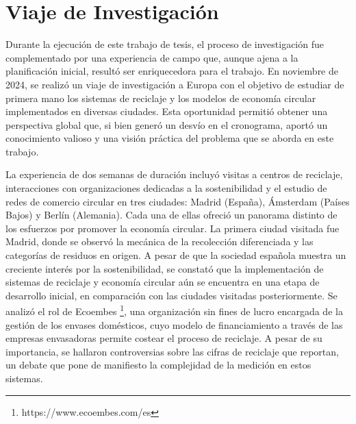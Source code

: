 \chapter{Viaje de Investigación}
\label{cp:europe-trip}

Durante la ejecución de este trabajo de tesis, el proceso de investigación fue complementado por una experiencia de campo que, aunque ajena a la planificación inicial, resultó ser enriquecedora para el trabajo. En noviembre de 2024, se realizó un viaje de investigación a Europa con el objetivo de estudiar de primera mano los sistemas de reciclaje y los modelos de economía circular implementados en diversas ciudades. Esta oportunidad permitió obtener una perspectiva global que, si bien generó un desvío en el cronograma, aportó un conocimiento valioso y una visión práctica del problema que se aborda en este trabajo.

La experiencia de dos semanas de duración incluyó visitas a centros de reciclaje, interacciones con organizaciones dedicadas a la sostenibilidad y el estudio de redes de comercio circular en tres ciudades: Madrid (España), Ámsterdam (Países Bajos) y Berlín (Alemania). Cada una de ellas ofreció un panorama distinto de los esfuerzos por promover la economía circular. La primera ciudad visitada fue Madrid, donde se observó la mecánica de la recolección diferenciada y las categorías de residuos en origen. A pesar de que la sociedad española muestra un creciente interés por la sostenibilidad, se constató que la implementación de sistemas de reciclaje y economía circular aún se encuentra en una etapa de desarrollo inicial, en comparación con las ciudades visitadas posteriormente. Se analizó el rol de Ecoembes \footnote{https://www.ecoembes.com/es}, una organización sin fines de lucro encargada de la gestión de los envases domésticos, cuyo modelo de financiamiento a través de las empresas envasadoras permite costear el proceso de reciclaje. A pesar de su importancia, se hallaron controversias sobre las cifras de reciclaje que reportan, un debate que pone de manifiesto la complejidad de la medición en estos sistemas.

